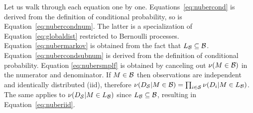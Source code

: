 \documentclass[]{article}
\begin{document}
Let us walk through each equation one by one.
Equations~\ref{eq:nubercond} is derived from the definition of
conditional probability, so is Equation~\ref{eq:nubercondnum}.  The
latter is a specialization of Equation~\ref{eq:globaldist} restricted
to Bernoulli processes.  Equation~\ref{eq:nubermarkov} is obtained
from the fact that $L_{\mathcal{B}} \subseteq \mathcal{B}$.
Equation~\ref{eq:nubercondsubnum} is derived from the definition of
conditional probability.  Equation \ref{eq:nubersmplf} is obtained by
canceling out $\nu(M \in \mathcal{B})$ in the numerator and
denominator.  If $M \in \mathcal{B}$ then observations are independent
and identically distributed (iid), therefore $\nu(D_{\mathcal{S}} | M \in
\mathcal{B}) = \prod_{i\in \mathcal{S}} \nu(D_{i} | M \in
L_{\mathcal{B}})$.  The same applies to $\nu(D_{\mathcal{S}} | M \in
L_{\mathcal{B}})$ since $L_{\mathcal{B}} \subseteq \mathcal{B}$,
resulting in Equation~\ref{eq:nuberiid}.\\
\end{document}
